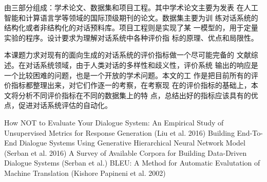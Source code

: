 % 
% 
% 
% 


\assignReq
{由三部分组成：学术论文、数据集和项目工程。其中学术论文主要为发表}
{在人工智能和计算语言学等领域的国际顶级期刊的论文。数据集主要为训}
{练对话系统的结构化或者非结构化的对话预料库。项目工程则是实现了某}
{一模型的，用于定量实验的程序。设计要求为理解对话系统中各种评价指}
{标的原理、优点和局限性。}

\assignWork
{本课题力求对现有的面向生成的对话系统的评价指标做一个尽可能完备的}
{文献综述。在对话系统领域，由于人类对话的多样性和歧义性，评价系统}
{输出的响应是一个比较困难的问题，也是一个开放的学术问题。本文的工}
{作是把目前所有的评价指标都整理出来，对它们作逐一的考察，在考察现}
{在的评价指标的基础上，本文将分析不同评价指标在不同的数据集上的特}
{点，总结出好的指标应该具有的优点，促进对话系统评估的自动化。}

\assignRef
{How NOT to Evaluate Your Dialogue System: An Empirical Study of Unsupervised}
{Metrics for Response Generation (Liu et al. 2016)}
{Building End-To-End Dialogue Systems Using Generative Hierarchical Neural}
{Network Model (Serban et al. 2016)}
{A Survey of Available Corpora for Building Data-Driven Dialogue Systems}
{(Serban et al.)}
{BLEU: A Method for Automatic Evalutation of Machine Translation}
{(Kishore Papineni et al. 2002)}
